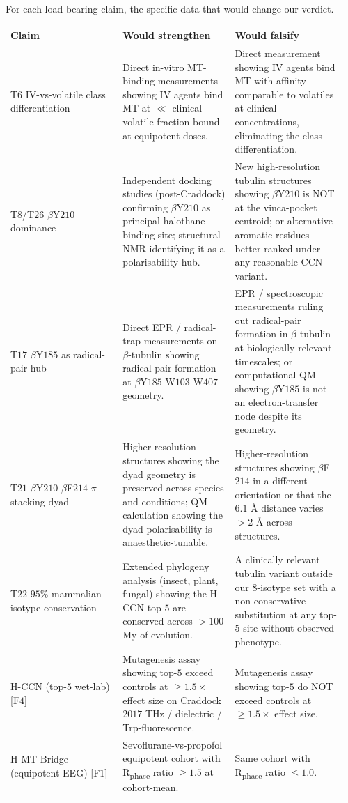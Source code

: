 \documentclass[11pt,a4paper]{article}
\begin{document}
For each load-bearing claim, the specific data that would change our verdict.

\begin{center}\small
\begin{tabular}{p{0.32\linewidth}p{0.32\linewidth}p{0.32\linewidth}}\toprule
\textbf{Claim} & \textbf{Would strengthen} & \textbf{Would falsify} \\\midrule
T$6$ IV-vs-volatile class differentiation
& Direct in-vitro MT-binding measurements showing IV agents bind MT at $\ll$ clinical-volatile fraction-bound at equipotent doses.
& Direct measurement showing IV agents bind MT with affinity comparable to volatiles at clinical concentrations, eliminating the class differentiation. \\
T$8$/T$26$ $\beta$Y$210$ dominance
& Independent docking studies (post-Craddock) confirming $\beta$Y$210$ as principal halothane-binding site; structural NMR identifying it as a polarisability hub.
& New high-resolution tubulin structures showing $\beta$Y$210$ is NOT at the vinca-pocket centroid; or alternative aromatic residues better-ranked under any reasonable CCN variant. \\
T$17$ $\beta$Y$185$ as radical-pair hub
& Direct EPR / radical-trap measurements on $\beta$-tubulin showing radical-pair formation at $\beta$Y$185$-W$103$-W$407$ geometry.
& EPR / spectroscopic measurements ruling out radical-pair formation in $\beta$-tubulin at biologically relevant timescales; or computational QM showing $\beta$Y$185$ is not an electron-transfer node despite its geometry. \\
T$21$ $\beta$Y$210$-$\beta$F$214$ $\pi$-stacking dyad
& Higher-resolution structures showing the dyad geometry is preserved across species and conditions; QM calculation showing the dyad polarisability is anaesthetic-tunable.
& Higher-resolution structures showing $\beta$F$214$ in a different orientation or that the $6.1$ \AA{} distance varies $> 2$ \AA{} across structures. \\
T$22$ $95\%$ mammalian isotype conservation
& Extended phylogeny analysis (insect, plant, fungal) showing the H-CCN top-$5$ are conserved across $> 100$ My of evolution.
& A clinically relevant tubulin variant outside our $8$-isotype set with a non-conservative substitution at any top-$5$ site without observed phenotype. \\
H-CCN (top-$5$ wet-lab) [F$4$]
& Mutagenesis assay showing top-$5$ exceed controls at $\geq 1.5\times$ effect size on Craddock $2017$ THz / dielectric / Trp-fluorescence.
& Mutagenesis assay showing top-$5$ do NOT exceed controls at $\geq 1.5\times$ effect size. \\
H-MT-Bridge (equipotent EEG) [F$1$]
& Sevoflurane-vs-propofol equipotent cohort with R\textsubscript{phase} ratio $\geq 1.5$ at cohort-mean.
& Same cohort with R\textsubscript{phase} ratio $\leq 1.0$. \\
\bottomrule\end{tabular}
\end{center}
\end{document}
